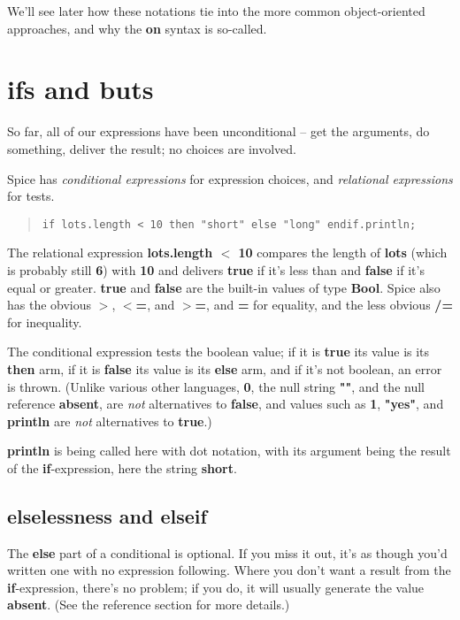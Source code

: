 \documentclass{report}
\begin{document}
We'll see later how these notations tie into the more common object-oriented
approaches, and why the {\bf on} syntax is so-called.\chapter{ifs and buts}


So far, all of our expressions have been unconditional -- get the arguments,
do something, deliver the result; no choices are involved.

Spice has {\em conditional expressions} for expression choices, and {\em relational
expressions} for tests.

\begin{quote}
\begin{verbatim}
if lots.length < 10 then "short" else "long" endif.println;
\end{verbatim}
\end{quote}


The relational expression {\bf lots.length $<$ 10} compares the length of {\bf lots}
(which is probably still {\bf 6}) with {\bf 10} and delivers {\bf true} if it's less than
and {\bf false} if it's equal or greater. {\bf true} and {\bf false} are the built-in
values of type {\bf Bool}. Spice also has the obvious {\bf $>$}, {\bf $<$=}, and {\bf $>$=}, and {\bf =}
for equality, and the less obvious {\bf /=} for inequality.

The conditional expression tests the boolean value; if it is {\bf true} its value
is its {\bf then} arm, if it is {\bf false} its value is its {\bf else} arm, and if it's
not boolean, an error is thrown. (Unlike various other languages, {\bf 0}, the
null string {\bf ""}, and the null reference {\bf absent}, are {\em not}
alternatives to {\bf false}, and values such as {\bf 1}, {\bf "yes"}, and {\bf println} are
{\em not} alternatives to {\bf true}.)

{\bf println} is being called here with dot notation, with its argument being the
result of the {\bf if}-expression, here the string {\bf short}.

\section{elselessness and elseif}


The {\bf else} part of a conditional is optional. If you miss it out, it's as
though you'd written one with no expression following. Where you don't want a
result from the {\bf if}-expression, there's no problem; if you do, it will
usually generate the value {\bf absent}. (See the reference section for more
details.)
\end{document}
